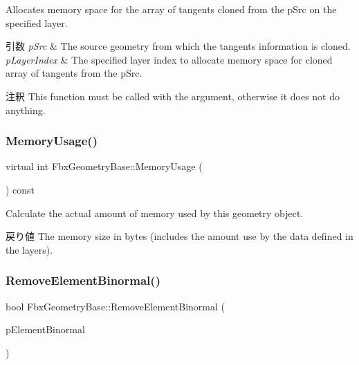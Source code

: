 Allocates memory space for the array of tangents cloned from the p\+Src on the specified layer. 
\begin{DoxyParams}{引数}
{\em p\+Src} & The source geometry from which the tangents information is cloned. \\
\hline
{\em p\+Layer\+Index} & The specified layer index to allocate memory space for cloned array of tangents from the p\+Src. \\
\hline
\end{DoxyParams}
\begin{DoxyRemark}{注釈}
This function must be called with the argument, otherwise it does not do anything. 
\end{DoxyRemark}
\mbox{\label{class_fbx_geometry_base_a858cccba0c319e1ee9160c0d7209bacf}} 
\subsubsection{\texorpdfstring{Memory\+Usage()}{MemoryUsage()}}
{\footnotesize\ttfamily virtual int Fbx\+Geometry\+Base\+::\+Memory\+Usage (\begin{DoxyParamCaption}{ }\end{DoxyParamCaption}) const\hspace{0.3cm}{\ttfamily [virtual]}}

Calculate the actual amount of memory used by this geometry object. \begin{DoxyReturn}{戻り値}
The memory size in bytes (includes the amount use by the data defined in the layers). 
\end{DoxyReturn}
\mbox{\label{class_fbx_geometry_base_a07a88ca035b8b21b407a88bef375831f}} 
\subsubsection{\texorpdfstring{Remove\+Element\+Binormal()}{RemoveElementBinormal()}}
{\footnotesize\ttfamily bool Fbx\+Geometry\+Base\+::\+Remove\+Element\+Binormal (\begin{DoxyParamCaption}\item[{\hyperlink{fbxlayer_8h_a066e30a64eb051458583b656a651e90b}{Fbx\+Geometry\+Element\+Binormal} $\ast$}]{p\+Element\+Binormal }\end{DoxyParamCaption})}

